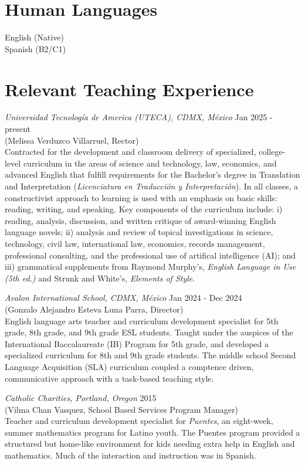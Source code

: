 \begin{resume}
\section{Human Languages}
English (Native) \\
Spanish (B2/C1)

\section {Relevant Teaching Experience}
{\sl Universidad Tecnología de America (UTECA), CDMX, México} \hfill Jan 2025 - present \\
(Melissa Verduzco Villarruel, Rector) \\
Contracted for the development and classroom delivery of specialized, college-level curriculum in the areas of science and technology, law, economics, and advanced English that fulfill requirements for the Bachelor's degree in Translation and Interpretation (\textit{Licenciatura en Traducción y Interpretación}). In all classes, a constructivist approach to learning is used with an emphasis on basic skills: reading, writing, and speaking. Key components of the curriculum include: i) reading, analysis, discussion, and written critique of award-winning English language novels; ii) analysis and review of topical investigations in science, technology, civil law, international law, economics, records management, professional consulting, and the professional use of artifical intelligence (AI); and iii) grammatical supplements from Raymond Murphy's, \textit{English Language in Use (5th ed.)} and Strunk and White's, \textit{Elements of Style}.

{\sl Avalon International School, CDMX, México} \hfill Jan 2024 - Dec 2024 \\
(Gonzalo Alejandro Esteva Luna Parra, Director) \\
English language arts teacher and curriculum development specialist for 5th grade, 8th grade, and 9th grade ESL students. Taught under the auspices of the International Baccalaureate (IB) Program for 5th grade, and developed a specialized curriculum for 8th and 9th grade students. The middle school Second Language Acquisition (SLA) curriculum coupled a comptence driven, communicative approach with a task-based teaching style. 

{\sl Catholic Charities, Portland, Oregon} \hfill 2015 \\
(Vilma Chan Vasquez, School Based Services Program Manager) \\
Teacher and curriculum development specialist for {\sl Puentes}, an eight-week, summer mathematics program for Latino youth. The Puentes program provided a structured but home-like environment for kids needing extra help in English and mathematics. Much of the interaction and instruction was in Spanish. 


\end{resume}
